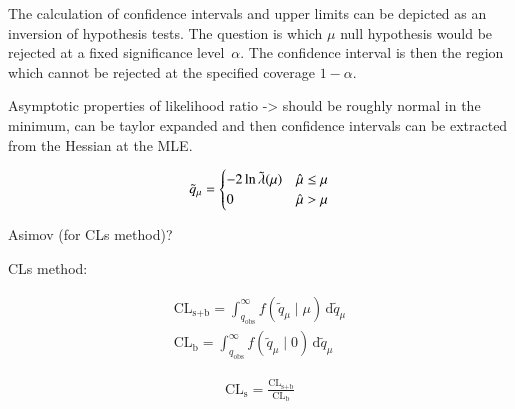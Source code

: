 The calculation of confidence intervals and upper limits can be
depicted as an inversion of hypothesis tests. The question is which
$\mu$ null hypothesis would be rejected at a fixed significance
level~$\alpha$. The confidence interval is then the region which
cannot be rejected at the specified coverage $1 - \alpha$.

Asymptotic properties of likelihood ratio -> should be roughly normal
in the minimum, can be taylor expanded and then confidence intervals
can be extracted from the Hessian at the MLE.


\begin{align}
  \tilde{q}_\mu =
  \begin{cases}
    -2 \ln \tilde{\lambda}(\mu) & \hat{\mu} \leq \mu \\
    0 & \hat{\mu} > \mu
  \end{cases}
\end{align}

Asimov (for CLs method)?

CLs method: \cite{Read:2002hq}

\begin{align}
  \text{CL}_\text{s+b} = \int^\infty_{q_\text{obs}} f(\tilde{q}_\mu \mid \mu) \, \mathrm{d}\tilde{q}_\mu \\
  \text{CL}_\text{b} = \int^\infty_{q_\text{obs}} f(\tilde{q}_\mu \mid 0) \, \mathrm{d}\tilde{q}_\mu
\end{align}


\begin{align}
  \text{CL}_\text{s} = \frac{\text{CL}_\text{s+b}}{\text{CL}_\text{b}}
\end{align}





